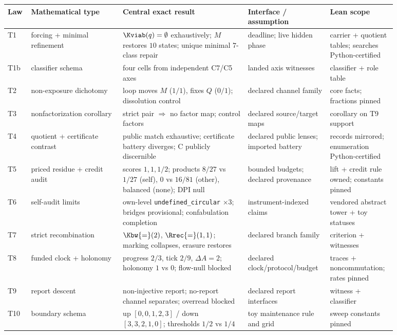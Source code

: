 \begin{table}[p]
\centering\footnotesize
\begin{tabular}{p{0.05\linewidth}p{0.22\linewidth}p{0.3\linewidth}p{0.16\linewidth}p{0.15\linewidth}}
\toprule
Law & Mathematical type & Central exact result & Interface / assumption & Lean scope \\
\midrule
T1 & forcing + minimal refinement & $\Kviab(q)=\emptyset$ exhaustively; $M$ restores $10$ states; unique minimal $7$-class repair & deadline; live hidden phase & carrier + quotient tables; searches Python-certified \\
T1b & classifier schema & four cells from independent C7/C5 axes & landed axis witnesses & classifier + role table \\
T2 & non-exposure dichotomy & loop moves $M$ ($1/1$), fixes $Q$ ($0/1$); dissolution control & declared channel family & core facts; fractions pinned \\
T3 & nonfactorization corollary & strict pair $\Rightarrow$ no factor map; control factors & declared source/target maps & corollary on T9 support \\
T4 & quotient + certificate contrast & public match exhaustive; certificate battery diverges; C publicly discernible & declared public lenses; imported battery & records mirrored; enumeration Python-certified \\
T5 & priced residue + credit audit & scores $1,1,1/2$; products $8/27$ vs $1/27$ (self), $0$ vs $16/81$ (other), balanced (none); DPI null & bounded budgets; declared provenance & lift + credit rule owned; constants pinned \\
T6 & self-audit limits & own-level \texttt{undefined\_circular} $\times 3$; bridges provisional; confabulation completion & instrument-indexed claims & vendored abstract tower + toy statuses \\
T7 & strict recombination & $\Kbw{=}(2)$, $\Rrec{=}(1,1)$; marking collapses, erasure restores & declared branch family & criterion + witnesses \\
T8 & funded clock + holonomy & progress $2/3$, tick $2/9$, $\Delta A{=}2$; holonomy $1$ vs $0$; flow-null blocked & declared clock/protocol/budget & traces + noncommutation; rates pinned \\
T9 & report descent & non-injective report; no-report channel separates; overread blocked & declared report interfaces & witness + classifier \\
T10 & boundary schema & up $[0,0,1,2,3]$ / down $[3,3,2,1,0]$; thresholds $1/2$ vs $1/4$ & toy maintenance rule and grid & sweep constants pinned \\

\end{tabular}
\end{table}

